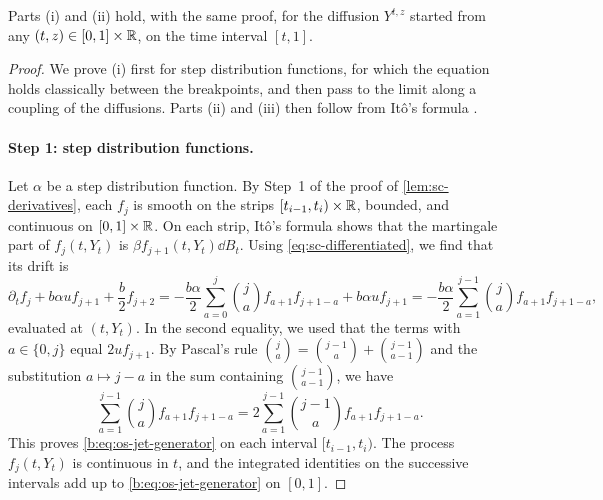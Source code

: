 Parts (i) and (ii) hold, with the same proof, for the diffusion $Y^{t,z}$
started from any $(t,z)\in[0,1]\times\mathbb R$, on the time interval $[t,1]$.

\begin{proof}
We prove (i) first for step distribution functions, for which the equation
holds classically between the breakpoints, and then pass to the limit along
a coupling of the diffusions. Parts (ii) and (iii) then follow from It\^o's
formula \cite[Theorem~3.3.6]{karatzas-shreve-1991}.

\paragraph{Step 1: step distribution functions.}
Let $\alpha$ be a step distribution function. By Step~1 of the proof of
\cref{lem:sc-derivatives}, each $f_j$ is smooth on the strips
$[t_{i-1},t_i)\times\mathbb R$, bounded, and continuous on $[0,1]\times\mathbb R$. On each
strip, It\^o's formula shows that the martingale part of $f_j(t,Y_t)$ is
$\beta f_{j+1}(t,Y_t)\dd B_t$. Using \eqref{eq:sc-differentiated}, we find
that its drift is
\[
 \partial_tf_j+b\alpha u f_{j+1}+\frac b2f_{j+2}
 =-\frac{b\alpha}2\sum_{a=0}^j\binom ja f_{a+1}f_{j+1-a}+b\alpha uf_{j+1}
 =-\frac{b\alpha}2\sum_{a=1}^{j-1}\binom ja f_{a+1}f_{j+1-a},
\]
evaluated at $(t,Y_t)$. In the second equality, we used that the terms with
$a\in\{0,j\}$ equal $2uf_{j+1}$. By Pascal's rule
$\binom ja=\binom{j-1}a+\binom{j-1}{a-1}$ and the substitution
$a\mapsto j-a$ in the sum containing $\binom{j-1}{a-1}$, we have
\[
 \sum_{a=1}^{j-1}\binom ja f_{a+1}f_{j+1-a}
 =2\sum_{a=1}^{j-1}\binom{j-1}a f_{a+1}f_{j+1-a}.
\]
This proves \eqref{b:eq:os-jet-generator} on each interval $[t_{i-1},t_i)$.
The process $f_j(t,Y_t)$ is continuous in $t$, and the integrated identities
on the successive intervals add up to \eqref{b:eq:os-jet-generator} on
$[0,1]$.


\end{proof}
